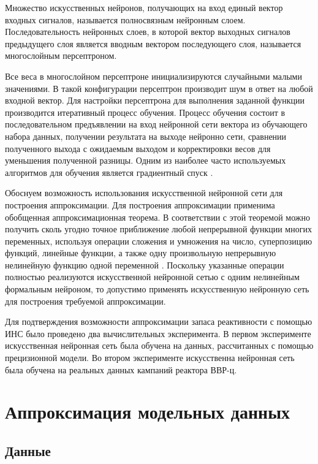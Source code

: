 Множество искусственных нейронов, получающих на вход единый вектор входных сигналов, называется полносвязным нейронным слоем.
Последовательность нейронных слоев, в которой вектор выходных сигналов предыдущего слоя является вводным вектором последующего слоя, называется многослойным персептроном.

Все веса в многослойном персептроне инициализируются случайными малыми
значениями.
В такой конфигурации персептрон производит шум в ответ на любой входной вектор. Для настройки персептрона для выполнения заданной функции производится итеративный процесс обучения.
Процесс обучения состоит в последовательном предъявлении на вход нейронной сети вектора из обучающего набора данных, получении результата на выходе нейронно сети, сравнении полученного выхода с ожидаемым выходом и корректировки весов для уменьшения полученной разницы.
Одним из наиболее часто используемых алгоритмов для обучения является градиентный спуск \cite{neuron-filatova}.

Обоснуем возможность использования искусственной нейронной сети для построения аппроксимации.
Для построения аппроксимации применима обобщенная аппроксимационная теорема. В соответствии с этой теоремой можно получить сколь угодно точное приближение любой непрерывной функции многих переменных, используя операции сложения и умножения на число, суперпозицию функций, линейные функции, а также одну произвольную непрерывную нелинейную функцию одной переменной \cite{neuron-gorban}.
Поскольку указанные операции полностью реализуются искусственной нейронной сетью с одним нелинейным формальным нейроном, то допустимо применять искусственную нейронную сеть для построения требуемой аппроксимации.

Для подтверждения возможности аппроксимации запаса реактивности с
помощью ИНС было проведено два вычислительных эксперимента.
В первом эксперименте искусственная нейронная сеть была обучена на данных, рассчитанных с помощью прецизионной модели.
Во втором эксперименте искусственна нейронная сеть была обучена на реальных данных кампаний реактора ВВР-ц.

\section{Аппроксимация модельных данных}

\subsection{Данные}

